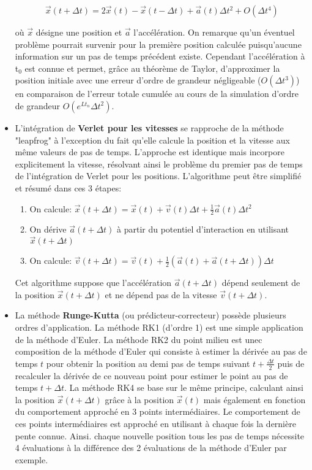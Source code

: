 \begin{itemize}
	$$\overrightarrow{x}(t +\Delta t) = 2\overrightarrow{x}(t) - \overrightarrow{x}(t - \Delta t) + \overrightarrow{a}(t)\Delta t^2 + O(\Delta t^4)$$ 

	où $\overrightarrow{x}$ désigne une position et $\overrightarrow{a}$ l'accélération.
	On remarque qu'un éventuel problème pourrait survenir pour la première position calculée puisqu'aucune information sur un pas de temps précédent existe. Cependant l'accélération à t$_0$ est connue et permet, grâce au théorème de Taylor, d'approximer la position initiale avec une erreur d'ordre de grandeur négligeable ($O(\Delta t^3)$) en comparaison de l'erreur totale cumulée au cours de la simulation d'ordre de grandeur $O(e^{Lt_n}\Delta t^2)$.
	\item L'intégration de \textbf{Verlet pour les vitesses} se rapproche de la méthode "leapfrog" à l'exception du fait qu'elle calcule la position et la vitesse aux même valeurs de pas de temps. L'approche est identique mais incorpore explicitement la vitesse, résolvant ainsi le problème du premier pas de temps de l'intégration de Verlet pour les positions. L'algorithme peut être simplifié et résumé dans ces 3 étapes:
	\begin{enumerate}
		\item On calcule: $\overrightarrow{x}(t+\Delta t) = \overrightarrow{x}(t) + \overrightarrow{v}(t)\Delta t + \frac{1}{2}\overrightarrow{a}(t)\Delta t^2$
		\item On dérive $\overrightarrow{a}(t+\Delta t)$ à partir du potentiel d'interaction en utilisant $\overrightarrow{x}(t+\Delta t)$
		\item On calcule: $\overrightarrow{v}(t+\Delta t) = \overrightarrow{v}(t) + \frac{1}{2} (\overrightarrow{a}(t) + \overrightarrow{a}(t+\Delta t))\Delta t$
	\end{enumerate}
	Cet algorithme suppose que l'accélération $\overrightarrow{a}(t+\Delta t)$ dépend seulement de la position $\overrightarrow{x}(t+\Delta t)$ et ne dépend pas de la vitesse $\overrightarrow{v}(t+\Delta t)$.
	\item La méthode \textbf{Runge-Kutta} (ou prédicteur-correcteur) possède plusieurs ordres d'application. La méthode RK1 (d'ordre 1) est une simple application de la méthode d'Euler. La méthode RK2 du point milieu est unec composition de la méthode d'Euler qui consiste à estimer la dérivée au pas de temps $t$ pour obtenir la position au demi pas de temps suivant $t+\frac{\Delta t}{2}$ puis de recalculer la dérivée de ce nouveau point pour estimer le point au pas de temps $t+\Delta t$. La méthode RK4 se base sur le même principe, calculant ainsi la position $\overrightarrow{x}(t+\Delta t)$ grâce à la position $\overrightarrow{x}(t)$ mais également en fonction du comportement approché en 3 points intermédiaires. Le comportement de ces points intermédiaires est approché en utilisant à chaque fois la dernière pente connue. Ainsi. chaque nouvelle position tous les pas de temps nécessite 4 évaluations à la différence des 2 évaluations de la méthode d'Euler par exemple.
\end{itemize}


